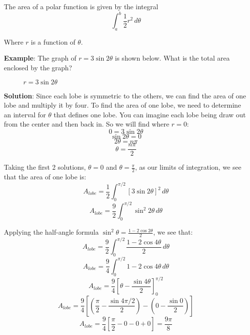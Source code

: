 \begin{mdframed}[style=important, frametitle={Area of a Polar Function}]
The area of a polar function is given by the integral 
$$\int_a^b \frac{1}{2} r^2\,d\theta$$

Where $r$ is a function of $\theta$. 
\end{mdframed}

\textbf{Example}: The graph of $r = 3\sin{2\theta}$ is shown below. What is 
the total area enclosed by the graph?

\begin{figure}[htbp]
\centering
    \caption{$r = 3\sin{2\theta}$}
    \label{fig:fourlobe}
\end{figure}

\textbf{Solution}: Since each lobe is symmetric to the others, we can find the 
area of one lobe and multiply it by four. To find the area of one lobe, we 
need to determine an interval for $\theta$ that defines one lobe. You can 
imagine each lobe being draw out from the center and then back in. So we will 
find where $r = 0$:
$$0 = 3\sin{2\theta}$$
$$\sin{2\theta} = 0$$
$$2\theta = n\pi$$
$$\theta = \frac{n\pi}{2}$$

Taking the first 2 solutions, $\theta = 0$ and $\theta = \frac{\pi}{2}$, as our 
limits of integration, we see that the area of one lobe is:
$$A_{lobe} = \frac{1}{2} \int_0^{\pi/2} \left[3 \sin{2 \theta} \right]^2\,d
\theta$$
$$A_{lobe} = \frac{9}{2} \int_0^{\pi/2} \sin^2{2\theta}\,d\theta$$

Applying the half-angle formula $\sin^2{\theta} = \frac{1 - 2\cos{2\theta}}{2}$, 
we see that:
$$A_{lobe} = \frac{9}{2} \int_0^{\pi/2} \frac{1 - 2\cos{4\theta}}{2}\,d\theta$$
$$A_{lobe} = \frac{9}{4} \int_0^{\pi/2} 1 - 2\cos{4\theta}\,d\theta$$
$$A_{lobe} = \frac{9}{4} \left[ \theta - \frac{\sin{4\theta}}{2} \right]_{0}^{
\pi/2}$$
$$A_{lobe} = \frac{9}{4} \left[ \left( \frac{\pi}{2} - \frac{\sin{4\pi/2}}{2} 
\right) - \left(0 - \frac{\sin{0}}{2} \right) \right]$$
$$A_{lobe} = \frac{9}{4} \left[ \frac{\pi}{2} - 0 - 0 + 0 \right] = \frac{9
\pi}{8}$$

